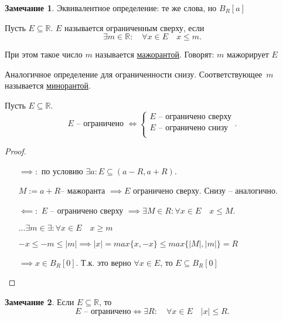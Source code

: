 \documentclass{book}
\newcommand\R{\ensuremath{\mathbb{R}}}
\theoremstyle{definition}
\newtheorem*{note}{Замечание}
\begin{document}
    \begin{note}
        Эквивалентное определение: те же слова, но $B_R[a]$
    \end{note}

    \begin{definition}
        Пусть $E \subseteq \R$. 
        $E$ называется ограниченным сверху, если 
        \[ \exists m\in \R:\quad \forall x\in E\quad x\leqslant m.\] 

        При этом такое число $m$ называется \underline{мажорантой}.
        Говорят: $m$ мажорирует $E$

        Аналогичное определение для ограниченности снизу. 
        Соответствующее~$m$ называется \underline{минорантой}.
    \end{definition}

    \begin{statement}
        Пусть $E\subseteq \R$.
        \[
        E \text{ -- ограничено } \iff  \begin{cases}
            E \text{ --  ограничено сверху}\\
            E \text{ -- ограничено снизу}\\
        \end{cases}
        .\] 
    \end{statement}
    \begin{proof}
    \begin{itemize}
        \item[$\implies:$]
            по условию $\exists a: E\subseteq (a-R, a+R)$.

            $M:=a+R$-- мажоранта $\implies E$ ограничено сверху. 
            Снизу -- аналогично.
        
            \item[$\impliedby:$]
            $E$ -- ограничено сверху $\implies \exists M\in R: \forall x\in E\quad x\leqslant M$.

            $\ldots \exists m\in \exists : \forall x\in E\quad x\geqslant m$

            $-x\leqslant -m \leqslant |m| \implies  |x| = max\{x, -x\}\leqslant max\{|M|, |m|\} = R$

            $\implies  x\in B_R[0]$. Т.к. это верно $\forall x\in E$, то $E    \subseteq  B_R[0]$
        \end{itemize}
    \end{proof}

    \begin{note}
        Если $E\subseteq \R$, то 
        \[
            E \text{ -- ограничено} \iff  \exists R:\quad \forall x\in E\quad |x|\leqslant R.
        \] 
    \end{note}
\end{document}
